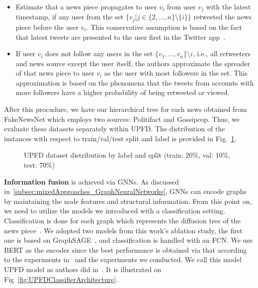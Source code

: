 \begin{itemize}
    \item Estimate that a news piece propagates to user $v_i$ from user $v_j$ with the latest timestamp, if any user from the set $\{v_j | j\in \{2, \dots, n\}\setminus \{i\}\}$ retweeted the news piece before the user $v_i$. This conservative assumption is based on the fact that latest tweets are presented to the user first in the Twitter app~\parencite{UPFD_Dataset_Shu}.
    \item If user $v_i$ does not follow any users in the set $\{v_1, \dots, v_n \} \setminus {i}$, i.e., all retweeters and news source except the user itself, the authors approximate the spreader of that news piece to user $v_i$ as the user with most followers in the set. This approximation is based on the phenomena that the tweets from accounts with more followers have a higher probability of being retweeted or viewed.
\end{itemize}
After this procudure, we have our hierarchical tree for each news obtained from FakeNewsNet which employs two sources: Politifact and Gossipcop. Thus, we evaluate these datasets separately within UPFD. The distribution of the instances with respect to train/val/test split and label is provided in Fig.~\ref{fig:UPFD_Dataset_Visualization}.\\
\begin{figure}
    \hfill
    \caption[UPFD dataset distribution by label and split]{UPFD dataset distribution by label and split (train: 20\%, val: 10\%, test: 70\%)}
    \label{fig:UPFD_Dataset_Visualization}
\end{figure}
\textbf{Information fusion} is achieved via GNNs. As discussed in~\ref{subsec:mixedApproaches_GraphNeuralNetworks}, GNNs can encode graphs by maintaining the node features and structural information. From this point on, we need to utilize the models we introduced with a classification setting. Classification is done for each graph which represents the diffusion tree of the news piece~\parencite{UPFD_Dataset_Shu}. We adopted two models from this work's ablation study, the first one is based on GraphSAGE~\parencite{GraphSAGE_Hamilton}, and classification is handled with an FCN. We use BERT as the encoder since the best performance is obtained via that according to the experiments in~\cite{UPFD_Dataset_Shu} and the experiments we conducted. We call this model UPFD model as authors did in~\cite{UPFD_Dataset_Shu}. It is illustrated on Fig~\ref{fig:UPFDClassifierArchitecture}.
